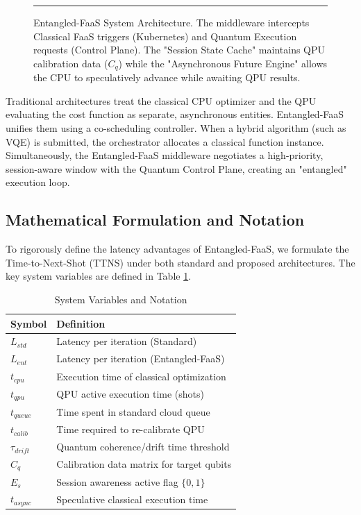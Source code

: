 \documentclass[conference]{IEEEtran}
\begin{document}
\begin{figure}[htbp]
    \centering
    \rule{\linewidth}{4cm} 
    \caption{Entangled-FaaS System Architecture. The middleware intercepts Classical FaaS triggers (Kubernetes) and Quantum Execution requests (Control Plane). The "Session State Cache" maintains QPU calibration data ($C_q$) while the "Asynchronous Future Engine" allows the CPU to speculatively advance while awaiting QPU results.}
    \label{fig:architecture}
\end{figure}

Traditional architectures treat the classical CPU optimizer and the QPU evaluating the cost function as separate, asynchronous entities. Entangled-FaaS unifies them using a co-scheduling controller. When a hybrid algorithm (such as VQE) is submitted, the orchestrator allocates a classical function instance. Simultaneously, the Entangled-FaaS middleware negotiates a high-priority, session-aware window with the Quantum Control Plane, creating an "entangled" execution loop.

\subsection{Mathematical Formulation and Notation}

To rigorously define the latency advantages of Entangled-FaaS, we formulate the Time-to-Next-Shot (TTNS) under both standard and proposed architectures. The key system variables are defined in Table \ref{tab:variables}.

\begin{table}[htbp]
\caption{System Variables and Notation}
\label{tab:variables}
\centering
\begin{tabular}{ll}
\hline
\textbf{Symbol} & \textbf{Definition} \\ \hline
$L_{std}$ & Latency per iteration (Standard) \\
$L_{ent}$ & Latency per iteration (Entangled-FaaS) \\
$t_{cpu}$ & Execution time of classical optimization \\
$t_{qpu}$ & QPU active execution time (shots) \\
$t_{queue}$ & Time spent in standard cloud queue \\
$t_{calib}$ & Time required to re-calibrate QPU \\
$\tau_{drift}$ & Quantum coherence/drift time threshold \\
$C_q$ & Calibration data matrix for target qubits \\
$E_s$ & Session awareness active flag $\{0,1\}$ \\
$t_{async}$ & Speculative classical execution time \\ \hline
\end{tabular}
\end{table}
\end{document}
